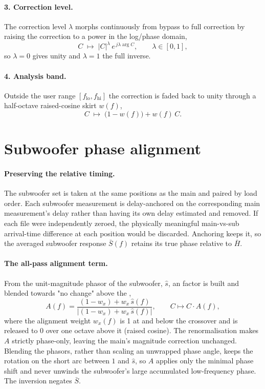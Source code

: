 \paragraph{3. Correction level.} The correction level $\lambda$ morphs continuously from bypass to full correction by raising the correction to a power in the log/phase domain,
\begin{equation}
  C \;\longmapsto\; |C|^{\lambda}\, e^{\,j\lambda\arg C},
  \qquad \lambda \in [0,1],
\end{equation}
so $\lambda=0$ gives unity and $\lambda=1$ the full inverse.

\paragraph{4. Analysis band.} Outside the user range $[f_{\mathrm{lo}},f_{\mathrm{hi}}]$ the correction is faded back to unity through a half-octave raised-cosine skirt $w(f)$,
\begin{equation}
  C \;\longmapsto\; \bigl(1-w(f)\bigr) + w(f)\,C .
\end{equation}

\section{Subwoofer phase alignment}\label{sec:thsubalign}
\paragraph{Preserving the relative timing.} The subwoofer set is taken at the same positions as the main and paired by load order. Each subwoofer measurement is delay-anchored on the corresponding main measurement's delay rather than having its own delay estimated and removed. If each file were independently zeroed, the physically meaningful main-vs-sub arrival-time difference at each position would be discarded. Anchoring keeps it, so the averaged subwoofer response $\bar S(f)$ retains its true phase relative to $\bar H$.

\paragraph{The all-pass alignment term.} From the unit-magnitude phasor of the subwoofer, $\hat s$, an  factor is built and blended towards "no change" above the ,
\begin{equation}
  A(f) = \frac{(1-w_x) + w_x\,\hat s(f)}{\bigl|(1-w_x) + w_x\,\hat s(f)\bigr|},
  \qquad C \longmapsto C\cdot A(f),
\end{equation}
where the alignment weight $w_x(f)$ is 1 at and below the crossover and is released to 0 over one octave above it (raised cosine). The renormalisation makes $A$ strictly phase-only, leaving the main's magnitude correction unchanged. Blending the phasors, rather than scaling an unwrapped phase angle, keeps the rotation on the short arc between $1$ and $\hat s$, so $A$ applies only the minimal phase shift and never unwinds the subwoofer's large accumulated low-frequency phase. The  inversion negates $\bar S$.

